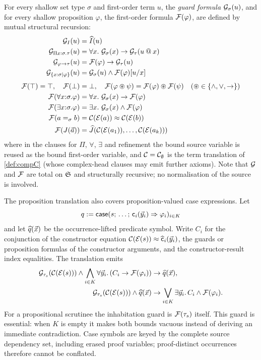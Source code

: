 \begin{definition}
\label{def:guard-F}
For every shallow set type $\sigma$ and first-order term $u$, the
\emph{guard formula} $\mathcal{G}_{\sigma}(u)$, and for every shallow
proposition $\varphi$, the first-order formula $\mathcal{F}(\varphi)$, are defined
by mutual structural recursion:
\begin{align*}
  \mathcal{G}_{I}(u) &= \widehat{I}(u)\\
  \mathcal{G}_{\Pi x{:}\sigma.\tau}(u) &=
    \forall x.\ \mathcal{G}_{\sigma}(x) \to \mathcal{G}_{\tau}(u \mathbin{@} x)\\
  \mathcal{G}_{\varphi \to \tau}(u) &= \mathcal{F}(\varphi) \to \mathcal{G}_{\tau}(u)\\
  \mathcal{G}_{\{x{:}\sigma \mid \varphi\}}(u) &=
    \mathcal{G}_{\sigma}(u) \wedge \mathcal{F}(\varphi)[u/x]
  \\[1ex]
  \mathcal{F}(\top) = \top, \quad \mathcal{F}(\bot) &= \bot, \quad
  \mathcal{F}(\varphi \circledast \psi) = \mathcal{F}(\varphi) \circledast \mathcal{F}(\psi)
  \quad (\circledast \in \{\wedge, \vee, \to\})\\
  \mathcal{F}(\forall x{:}\sigma.\varphi) &=
    \forall x.\ \mathcal{G}_{\sigma}(x) \to \mathcal{F}(\varphi)\\
  \mathcal{F}(\exists x{:}\sigma.\varphi) &=
    \exists x.\ \mathcal{G}_{\sigma}(x) \wedge \mathcal{F}(\varphi)\\
  \mathcal{F}(a =_{\sigma} b) &= \mathcal{C}(\mathcal{E}(a)) \approx \mathcal{C}(\mathcal{E}(b))\\
  \mathcal{F}(J(\vec{a})) &= \widehat{J}(\mathcal{C}(\mathcal{E}(a_1)), \dots,
    \mathcal{C}(\mathcal{E}(a_k)))
\end{align*}
where in the clauses for $\Pi$, $\forall$, $\exists$ and refinement the
bound source variable is reused as the bound first-order variable, and
$\mathcal{C} = \mathcal{C}_\emptyset$ is the term translation of \cref{def:compC}
(whose complex-head clauses may emit further axioms).  Note that
$\mathcal{G}$ and $\mathcal{F}$ are total on $\mathfrak{S}$ and structurally recursive; no
normalisation of the source is involved.
\end{definition}

The proposition translation also covers proposition-valued case expressions.
Let
\[
 q \mathrel{:=}
 \mathsf{case}(s;\,\dots;\,
   \mathsf{c}_i(\vec{y}_i) \Rightarrow \varphi_i)_{i \in K}
\]
and let $\widehat{q}(\vec{x})$ be the occurrence-lifted predicate symbol.  Write
$C_i$ for the conjunction of the constructor equation
$\mathcal{C}(\mathcal{E}(s)) \approx
 \widehat{\mathsf{c}}_i(\vec{y}_i)$, the guards or proposition formulas of the
constructor arguments, and the constructor-result index equalities.  The
translation emits
\begin{align*}
 \mathcal{G}_{\tau_s}(\mathcal{C}(\mathcal{E}(s))) \wedge
   \bigwedge_{i \in K}\forall\vec{y}_i.\,
     (C_i \to \mathcal{F}(\varphi_i))
   &\to \widehat{q}(\vec{x}),\\
 \mathcal{G}_{\tau_s}(\mathcal{C}(\mathcal{E}(s))) \wedge
   \widehat{q}(\vec{x})
   &\to \bigvee_{i \in K}\exists\vec{y}_i.\,
     C_i \wedge \mathcal{F}(\varphi_i).
\end{align*}
For a propositional scrutinee the inhabitation guard is
$\mathcal{F}(\tau_s)$ itself.  This guard is essential: when $K$ is empty it makes
both bounds vacuous instead of deriving an immediate contradiction.  Case
symbols are keyed by the complete source dependency set, including erased
proof variables; proof-distinct occurrences therefore cannot be conflated.

